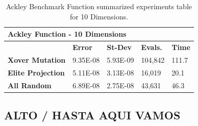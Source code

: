 \documentclass[graybox]{svmult}
\begin{document}
\begin{table}[]
    \scriptsize
    \centering
    \caption{Ackley Benchmark Function summarized experiments table for 10 Dimensions.}\label{tab.benchmark_fun_ackley10}
    \begin{tabular}{@{}lllll@{}}
    \toprule
    \multicolumn{5}{l}{\textbf{Ackley Function - 10 Dimensions}} \\ \midrule
     & \textbf{Error} & \textbf{St-Dev} & \textbf{Evals.} & \textbf{Time} \\
    \textbf{Xover Mutation} & 9.35E-08 & 5.93E-09 & 104,842 & 111.7 \\
    \textbf{Elite Projection} & 5.11E-08 & 3.13E-08 & 16,019 & 20.1 \\
    \textbf{All Random} & 6.89E-08 & 2.75E-08 & 43,631 & 46.3 \\ \bottomrule
    \end{tabular}
    \end{table}



\subsection{ALTO / HASTA AQUI VAMOS}
\end{document}
